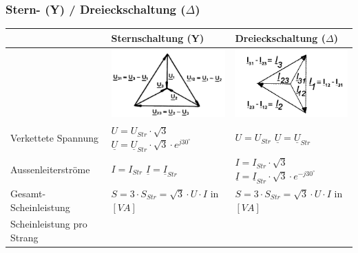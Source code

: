     \subsubsection{Stern- (Y) / Dreieckschaltung ($\Delta$)}
        \renewcommand{\arraystretch}{2}
        \begin{tabular}{| p{4.5cm} | l | l |}
            \hline
            &
            Sternschaltung (Y) &
            Dreieckschaltung ($\Delta$) \\
            \hline
            \vspace{0.2cm} &
            \includegraphics[width=5cm]{images/Sternspannung.png} &
            \includegraphics[width=5cm]{images/Dreieckstrom.png} \\
            \hline
            Verkettete Spannung &
            $U = U_{Str} \cdot \sqrt{3}$ \hspace{0.2cm} $\underline{U} = \underline{U}_{Str} \cdot \sqrt{3} \cdot e^{j 30^\circ}$ &
            $U = U_{Str}$ \hspace{0.2cm} $\underline{U} = \underline{U}_{Str}$ \\
            \hline
            Aussenleiterströme &
            $I = I_{Str}$ \hspace{0.2cm} $\underline{I} = \underline{I}_{Str}$ &
            $I = I_{Str} \cdot \sqrt{3} $ \hspace{0.2cm} $\underline{I} = \underline{I}_{Str} \cdot \sqrt{3} \cdot e^{-j 30^\circ} $ \\
            \hline
            Gesamt-Scheinleistung &
            $S = 3 \cdot S_{Str} =\sqrt{3} \cdot U \cdot I $ \hspace{0.2cm} in $[VA]$ &
            $S = 3 \cdot S_{Str} = \sqrt{3} \cdot U \cdot I$ \hspace{0.2cm} in $[VA]$ \\
            \hline
            Scheinleistung pro Strang &

\end{tabular}
